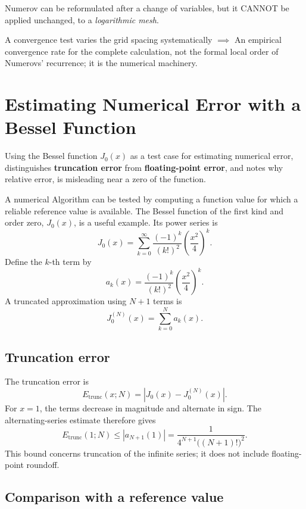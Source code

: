\documentclass[a4paper, 10pt, onepage]{elegantbook}
\begin{document}
{Numerov can be reformulated after a change of variables, but it CANNOT be applied unchanged, to a \emph{logarithmic 
mesh}.  

A convergence test varies the grid spacing systematically $\implies$ An empirical convergence rate for the complete 
calculation, 
not the formal local order of Numerovs' recurrence; it is the numerical machinery.

\newpage

\section{Estimating Numerical Error with a Bessel Function}

\noindent

Using the Bessel function \(J_0(x)\) as a test case for estimating numerical error,
 distinguishes \textbf{truncation error} from \textbf{floating-point error}, and notes why relative error, 
is misleading near a zero of the function.  

A numerical Algorithm can be tested by computing a function value for
which a reliable reference value is available. The Bessel function of
the first kind and order zero, \(J_0(x)\), is a useful example. Its
power series is
\[
J_0(x)
=
\sum_{k=0}^{\infty}
\frac{(-1)^k}{(k!)^2}
\left(\frac{x^2}{4}\right)^k.
\]
Define the \(k\)-th term by
\[
a_k(x)=
\frac{(-1)^k}{(k!)^2}
\left(\frac{x^2}{4}\right)^k.
\]
A truncated approximation using \(N+1\) terms is
\[
J_0^{(N)}(x)=\sum_{k=0}^{N}a_k(x).
\]

\subsection{Truncation error}

\noindent

The truncation error is
\[
E_{\mathrm{trunc}}(x;N)
=
\left|J_0(x)-J_0^{(N)}(x)\right|.
\]
For \(x=1\), the terms decrease in magnitude and alternate in sign.
The alternating-series estimate therefore gives
\[
E_{\mathrm{trunc}}(1;N)
\leq |a_{N+1}(1)|
=
\frac{1}{4^{N+1}\bigl((N+1)!\bigr)^2}.
\]
This bound concerns truncation of the infinite series; it does not
include floating-point roundoff.

\subsection{Comparison with a reference value}

\noindent

}
\end{document}
